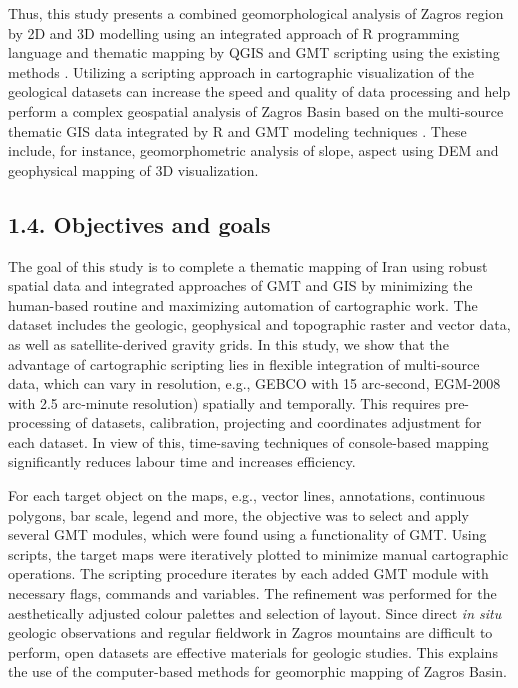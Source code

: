 \documentclass[12pt,a4paper,oneside]{article}
\def \newpar{\vspace{6pt}}
\begin{document}
\newpar Thus, this study presents a combined geomorphological analysis of Zagros region by 2D and 3D modelling using an integrated approach of R programming language and thematic mapping by QGIS and GMT scripting using the existing methods \citep{Lemenkova202203}. Utilizing a scripting approach in cartographic visualization of the geological datasets can increase the speed and quality of data processing and help perform a complex geospatial analysis of Zagros Basin based on the multi-source thematic GIS data integrated by R and GMT modeling techniques \citep{Lemenkova2019a}. These include, for instance, geomorphometric analysis of slope, aspect using DEM and geophysical mapping of 3D visualization. 

\subsection*{1.4. Objectives and goals}

\newpar The goal of this study is to complete a thematic mapping of Iran using robust spatial data and integrated approaches of GMT and GIS by minimizing the human-based routine and maximizing automation of cartographic work. The dataset includes the geologic, geophysical and topographic raster and vector data, as well as satellite-derived gravity grids. In this study, we show that the advantage of cartographic scripting lies in flexible integration of multi-source data, which can vary in resolution, e.g., GEBCO with 15 arc-second, EGM-2008 with 2.5 arc-minute resolution) spatially and temporally. This requires pre-processing of datasets, calibration, projecting and coordinates adjustment for each dataset. In view of this, time-saving techniques of console-based mapping significantly reduces labour time and increases efficiency. 

\newpar For each target object on the maps, e.g., vector lines, annotations, continuous polygons, bar scale, legend and more, the objective was to select and apply several GMT modules, which were found using a functionality of GMT. Using scripts, the target maps were iteratively plotted to minimize manual cartographic operations. The scripting procedure iterates by each added GMT module with necessary flags, commands and variables. The refinement was performed for the aesthetically adjusted colour palettes and selection of layout. Since direct \emph{in situ} geologic observations and regular fieldwork in Zagros mountains are difficult to perform, open datasets are effective materials for geologic studies. This explains the use of the computer-based methods for geomorphic mapping of Zagros Basin. 
\end{document}

